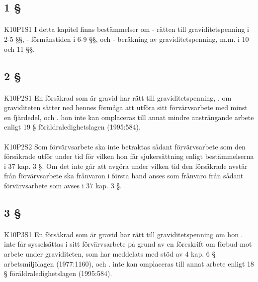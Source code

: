 \documentclass[a4paper,notitlepage,openany,10pt]{book}
\begin{document}
\subsection*{1 §}
\paragraph*{}
{\tiny K10P1S1}
I detta kapitel finns bestämmelser om
\newline - rätten till graviditetspenning i 2-5 §§,
\newline - förmånstiden i 6-9 §§, och
\newline - beräkning av graviditetspenning, m.m. i 10 och 11 §§.
\subsection*{2 §}
\paragraph*{}
{\tiny K10P2S1}
En försäkrad som är gravid har rätt till graviditetspenning,
. om graviditeten sätter ned hennes förmåga att utföra sitt förvärvsarbete med minst en fjärdedel, och
. hon inte kan omplaceras till annat mindre ansträngande arbete enligt 19 § föräldraledighetslagen (1995:584).
\paragraph*{}
{\tiny K10P2S2}
Som förvärvsarbete ska inte betraktas sådant förvärvsarbete som den försäkrade utför under tid för vilken hon får sjukersättning enligt bestämmelserna i 37 kap. 3 §. Om det inte går att avgöra under vilken tid den försäkrade avstår från förvärvsarbete ska frånvaron i första hand anses som frånvaro från sådant förvärvsarbete som avses i 37 kap. 3 §.
\subsection*{3 §}
\paragraph*{}
{\tiny K10P3S1}
En försäkrad som är gravid har rätt till graviditetspenning om hon
. inte får sysselsättas i sitt förvärvsarbete på grund av en föreskrift om förbud mot arbete under graviditeten, som har meddelats med stöd av 4 kap. 6 § arbetsmiljölagen (1977:1160), och
. inte kan omplaceras till annat arbete enligt 18 § föräldraledighetslagen (1995:584).
\end{document}
